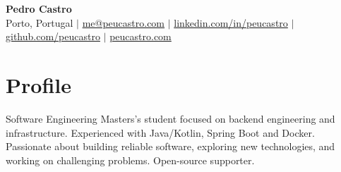 






\begin{center}
  \textbf{\Huge Pedro Castro} \\ \vspace{8pt}
  \faMapMarker*{} \small{Porto, Portugal} $|$
  \faEnvelope{}
  \href{mailto:me@peucastro.com}{me@peucastro.com}
  $|$
  \faLinkedin{}
  \href{https://linkedin.com/in/peucastro}{linkedin.com/in/peucastro}
  $|$
  \faGithub{}
  \href{https://github.com/peucastro}{github.com/peucastro}
  $|$
  \faGlobe{}
  \href{https://peucastro.com}{peucastro.com}
\end{center}

\section{Profile}
\small{Software Engineering Masters's student focused on backend
  engineering and infrastructure. Experienced with Java/Kotlin, Spring
  Boot and Docker. Passionate about building reliable software,
  exploring new technologies, and working on challenging problems.
Open-source supporter.}


